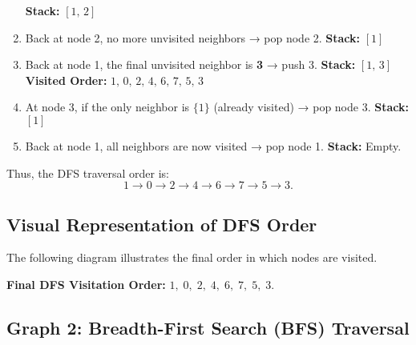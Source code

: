 \documentclass[11pt]{article}
\begin{document}
\begin{enumerate}
          \textbf{Stack:} \([1,\,2]\)
    \item Back at node 2, no more unvisited neighbors → pop node 2.
          \textbf{Stack:} \([1]\)
    \item Back at node 1, the final unvisited neighbor is \textbf{3} → push 3.
          \textbf{Stack:} \([1,\,3]\)
          \textbf{Visited Order:} \(1,\,0,\,2,\,4,\,6,\,7,\,5,\,3\)
    \item At node 3, if the only neighbor is \(\{1\}\) (already visited) → pop node 3.
          \textbf{Stack:} \([1]\)
    \item Back at node 1, all neighbors are now visited → pop node 1.
          \textbf{Stack:} Empty.
\end{enumerate}

Thus, the DFS traversal order is:
\[
    \boxed{1 \to 0 \to 2 \to 4 \to 6 \to 7 \to 5 \to 3.}
\]

\subsection*{Visual Representation of DFS Order}
The following diagram illustrates the final order in which nodes are visited.

\begin{center}
\end{center}



\textbf{Final DFS Visitation Order:} \(\boxed{1,\; 0,\; 2,\; 4,\; 6,\; 7,\; 5,\; 3.}\)


\subsection*{Graph 2: Breadth-First Search (BFS) Traversal}
\end{document}
